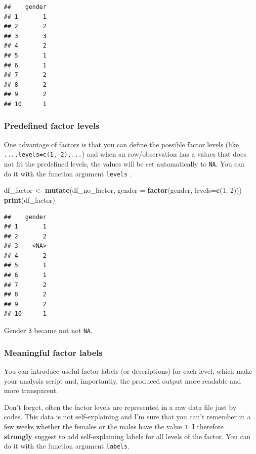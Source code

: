 \documentclass[
]{scrartcl}
\newenvironment{Shaded}{\begin{snugshade}}{\end{snugshade}}
\newcommand{\AttributeTok}[1]{\textcolor[rgb]{0.13,0.29,0.53}{#1}}
\newcommand{\DecValTok}[1]{\textcolor[rgb]{0.00,0.00,0.81}{#1}}
\newcommand{\FunctionTok}[1]{\textcolor[rgb]{0.13,0.29,0.53}{\textbf{#1}}}
\newcommand{\NormalTok}[1]{#1}
\newcommand{\OtherTok}[1]{\textcolor[rgb]{0.56,0.35,0.01}{#1}}
\begin{document}
\begin{verbatim}
##    gender
## 1       1
## 2       2
## 3       3
## 4       2
## 5       1
## 6       1
## 7       2
## 8       2
## 9       2
## 10      1
\end{verbatim}

\hypertarget{predefined-factor-levels}{%
\subsubsection{Predefined factor levels}\label{predefined-factor-levels}}

One advantage of factors is that you can define the possible factor levels (like \texttt{...,levels=c(1,\ 2),...}) and when an row/observation has a values that does not fit the predefined levels, the values will be set automatically to \texttt{NA}. You can do it with the function argument \texttt{levels} .

\begin{Shaded}
\begin{Highlighting}[]
\NormalTok{df\_factor }\OtherTok{\textless{}{-}}  \FunctionTok{mutate}\NormalTok{(df\_no\_factor,}
            \AttributeTok{gender =} \FunctionTok{factor}\NormalTok{(gender, }\AttributeTok{levels=}\FunctionTok{c}\NormalTok{(}\DecValTok{1}\NormalTok{, }\DecValTok{2}\NormalTok{)))}
\FunctionTok{print}\NormalTok{(df\_factor)}
\end{Highlighting}
\end{Shaded}

\begin{verbatim}
##    gender
## 1       1
## 2       2
## 3    <NA>
## 4       2
## 5       1
## 6       1
## 7       2
## 8       2
## 9       2
## 10      1
\end{verbatim}

Gender \texttt{3} became not not \texttt{NA}.

\hypertarget{meaningful-factor-labels}{%
\subsubsection{Meaningful factor labels}\label{meaningful-factor-labels}}

You can introduce useful factor labels (or descriptions) for each level, which make your analysis script and, importantly, the produced output more readable and more transparent.

Don't forget, often the factor levels are represented in a raw data file just by codes. This data is not self-explaining and I'm sure that you can't remember in a few weeks whether the females or the males have the value \texttt{1}. I therefore \textbf{strongly} suggest to add self-explaining labels for all levels of the factor. You can do it with the function argument \texttt{labels}.
\end{document}
